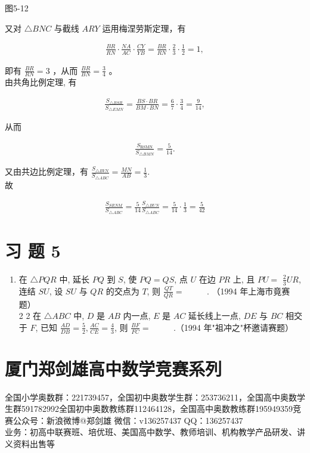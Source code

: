 \documentclass[10pt]{article}
\begin{document}
图5-12

又对 $\triangle B N C$ 与截线 $A R Y$ 运用梅涅劳斯定理，有

\begin{align*}
\frac{B R}{R N} \cdot \frac{N A}{A C} \cdot \frac{C Y}{Y B}=\frac{B R}{R N} \cdot \frac{2}{3} \cdot \frac{1}{2}=1,
\end{align*}

即有 $\frac{B R}{R N}=3$ ，从而 $\frac{B R}{B N}=\frac{3}{4}$ 。\\
由共角比例定理, 有

\begin{align*}
\frac{S_{\triangle B S R}}{S_{\triangle E M N}}=\frac{B S \cdot B R}{B M \cdot B N}=\frac{6}{7} \cdot \frac{3}{4}=\frac{9}{14},
\end{align*}

从而

\begin{align*}
\frac{S_{\mathrm{RSMN}}}{S_{\triangle B M N}}=\frac{5}{14} .
\end{align*}

又由共边比例定理，有 $\frac{S_{\triangle B V N}}{S_{\triangle A B C}}=\frac{M N}{A B}=\frac{1}{3}$.\\
故

\begin{align*}
\frac{S_{S R N M}}{S_{\triangle A B C}}=\frac{5}{14} \frac{S_{\triangle B U N}}{S_{\triangle A B C}}=\frac{5}{14} \cdot \frac{1}{3}=\frac{5}{42}
\end{align*}

\section*{习 题 5}
\begin{enumerate}
  \item 在 $\triangle P Q R$ 中, 延长 $P Q$ 到 $S$, 使 $P Q=Q S$, 点 $U$ 在边 $P R$ 上, 且 $P U=$ $\frac{2}{3} U R$, 连结 $S U$, 设 $S U$ 与 $Q R$ 的交点为 $T$, 则 $\frac{Q T}{Q R}=$ $\qquad$ . （1994 年上海市竟赛题）\\
2 2 在 $\triangle A B C$ 中, $D$ 是 $A B$ 内一点, $E$ 是 $A C$ 延长线上一点, $D E$ 与 $B C$ 相交于 $F$, 已知 $\frac{A D}{D B}=\frac{5}{2}, \frac{A C}{C E}=\frac{4}{3}$, 则 $\frac{B F}{F C}=$ $\qquad$ .（1994 年"祖冲之"杯邀请赛题）
\end{enumerate}

\section*{厦门郑剑雄高中数学竞赛系列}
全国小学奥数群：221739457，全国初中奥数学生群：253736211，全国高中奥数学生群591782992全国初中奥数教练群112464128，全国高中奥数教练群195949359竞赛公众号：新浪微博@郑剑雄 微信：v136257437 QQ：136257437\\
业务：初高中联赛班、培优班、美国高中数学、教师培训、机构教学产品研发、讲义资料出售等
\end{document}
